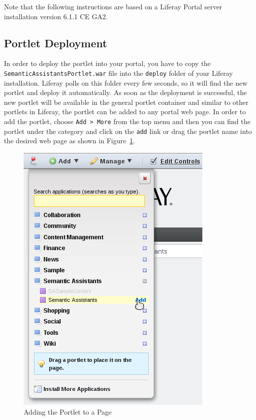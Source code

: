 Note that the following instructions are based on a Liferay Portal server installation version 6.1.1 CE GA2. 

\subsection{\sa Portlet Deployment}
In order to deploy the \sa portlet into your portal, you have to copy the \texttt{SemanticAssistantsPortlet.war} file into the \texttt{deploy} folder of your Liferay installation. Liferay polls on this folder every few seconds, so it will find the new portlet and deploy it automatically. As soon as the deployment is successful, the new portlet will be available in the general portlet container and similar to other portlets in Liferay, the \sa portlet can be added to any portal web page. In order to add the \sa portlet, choose \texttt{Add \textgreater~More} from the top menu and then you can find the portlet under the \sa category and click on the \texttt{add} link or drag the portlet name into the desired web page as shown in Figure~\ref{fig:liferay_add_portlet}.

\begin{figure}
\centering
\includegraphics[scale=0.6]{pictures/liferay_add_portlet.png}
\caption{Adding the \sa Portlet to a Page}
\label{fig:liferay_add_portlet}
\end{figure}

